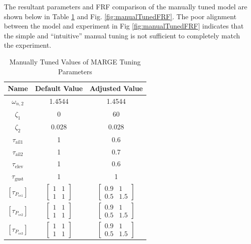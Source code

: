 The resultant parameters and FRF comparison of the manually tuned model are shown below in Table \ref{tab:manualTuning} and Fig. \ref{fig:manualTunedFRF}. The poor alignment between the model and experiment in Fig \ref{fig:manualTunedFRF} indicates that the simple and ``intuitive'' manual tuning is not sufficient to completely match the experiment.
\begin{table}[h]
	\centering
	\caption{Manually Tuned Values of MARGE Tuning Parameters}
	\label{tab:manualTuning}
	\begin{tabular}{ccc}
		\hline\hline
		Name & Default Value & Adjusted Value \\
		\hline
		$\omega_{n,2}$ & 1.4544 & 1.4544 \\
		$\zeta_1$ & 0 & 60 \\
		$\zeta_2$ & 0.028 & 0.028 \\
		$\tau_\text{ail1}$ & 1 & 0.6 \\
		$\tau_\text{ail2}$ & 1 & 0.7 \\
		$\tau_\text{elev}$ & 1 & 0.6 \\
		$\tau_\text{gust}$ & 1 & 1 \\
		$\left[\tau_{P_{ss1}}\right]$ & $\begin{bmatrix} 1 & 1 \\ 1 & 1 \end{bmatrix}$ & $\begin{bmatrix} 0.9 & 1 \\ 0.5 & 1.5 \end{bmatrix}$ \\
		$\left[\tau_{P_{ss2}}\right]$ & $\begin{bmatrix} 1 & 1 \\ 1 & 1 \end{bmatrix}$ & $\begin{bmatrix} 0.9 & 1 \\ 0.5 & 1.5 \end{bmatrix}$ \\
		$\left[\tau_{P_{ss3}}\right]$ & $\begin{bmatrix} 1 & 1 \\ 1 & 1 \end{bmatrix}$ & $\begin{bmatrix} 0.9 & 1 \\ 0.5 & 1.5 \end{bmatrix}$ \\
		\hline\hline
	\end{tabular}
\end{table}

